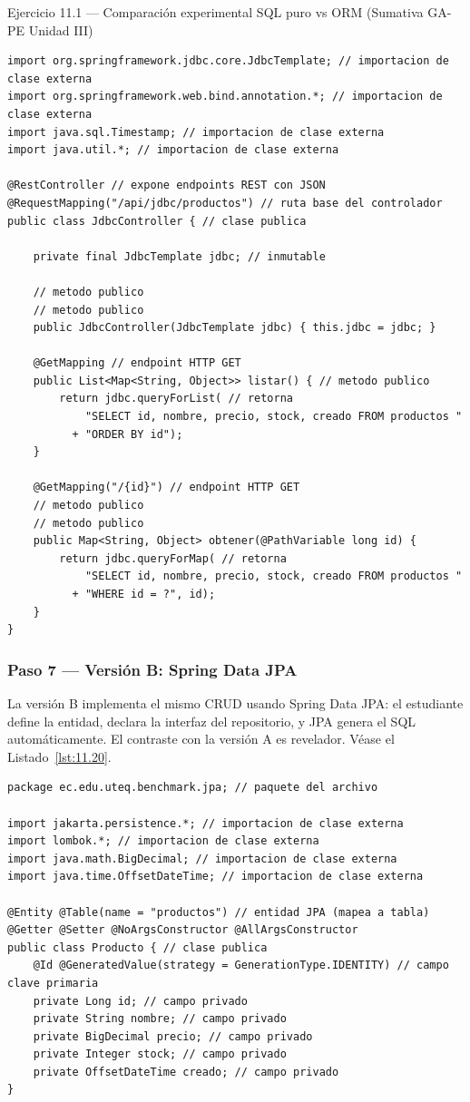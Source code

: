 \begin{cajaejercicio}{Ejercicio 11.1 --- Comparación experimental SQL puro vs ORM (Sumativa GA-PE Unidad III)}
\begin{lstlisting}[style=java,caption={JdbcController.java},label=lst:11.19]
import org.springframework.jdbc.core.JdbcTemplate; // importacion de clase externa
import org.springframework.web.bind.annotation.*; // importacion de clase externa
import java.sql.Timestamp; // importacion de clase externa
import java.util.*; // importacion de clase externa

@RestController // expone endpoints REST con JSON
@RequestMapping("/api/jdbc/productos") // ruta base del controlador
public class JdbcController { // clase publica

    private final JdbcTemplate jdbc; // inmutable

    // metodo publico
    // metodo publico
    public JdbcController(JdbcTemplate jdbc) { this.jdbc = jdbc; }

    @GetMapping // endpoint HTTP GET
    public List<Map<String, Object>> listar() { // metodo publico
        return jdbc.queryForList( // retorna
            "SELECT id, nombre, precio, stock, creado FROM productos "
          + "ORDER BY id");
    }

    @GetMapping("/{id}") // endpoint HTTP GET
    // metodo publico
    // metodo publico
    public Map<String, Object> obtener(@PathVariable long id) {
        return jdbc.queryForMap( // retorna
            "SELECT id, nombre, precio, stock, creado FROM productos "
          + "WHERE id = ?", id);
    }
}
\end{lstlisting}

\subsubsection*{Paso 7 --- Versión B: Spring Data JPA}

La versión B implementa el mismo CRUD usando Spring Data
JPA: el estudiante define la entidad, declara la interfaz del
repositorio, y JPA genera el SQL automáticamente. El contraste con
la versión A es revelador. V\'ease el Listado~\ref{lst:11.20}.


\begin{lstlisting}[style=java,caption={Producto.java},label=lst:11.20]
package ec.edu.uteq.benchmark.jpa; // paquete del archivo

import jakarta.persistence.*; // importacion de clase externa
import lombok.*; // importacion de clase externa
import java.math.BigDecimal; // importacion de clase externa
import java.time.OffsetDateTime; // importacion de clase externa

@Entity @Table(name = "productos") // entidad JPA (mapea a tabla)
@Getter @Setter @NoArgsConstructor @AllArgsConstructor
public class Producto { // clase publica
    @Id @GeneratedValue(strategy = GenerationType.IDENTITY) // campo clave primaria
    private Long id; // campo privado
    private String nombre; // campo privado
    private BigDecimal precio; // campo privado
    private Integer stock; // campo privado
    private OffsetDateTime creado; // campo privado
}
\end{lstlisting}


\end{cajaejercicio}
